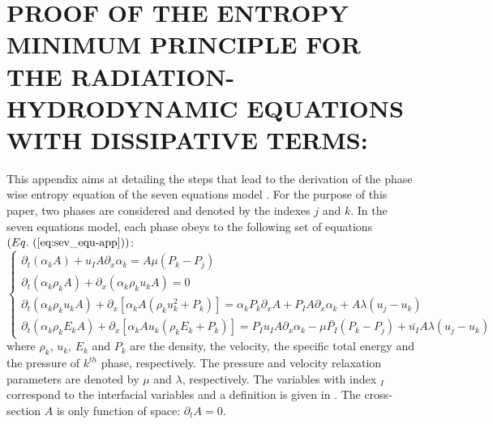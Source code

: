%
%
%


\chapter{\uppercase{Proof of the entropy minimum principle for the radiation-hydrodynamic equations with dissipative terms:}}
\label{app:sev-equ-model-entropy}
This appendix aims at detailing the steps that lead to the derivation of the phase wise entropy equation of the seven equations model \cite{SEM}. For the purpose of this paper, two phases are considered and denoted by the indexes $j$ and $k$. In the seven equations model, each phase obeys to the following set of equations $(\eqt{eq:sev_equ-app})$:
\begin{equation}
\label{eq:sev_equ-app}
\left\{
\begin{array}{llll}
\partial_t \left( \alpha_k  A\right) + u_I A \partial_x \alpha_k = A \mu \left( P_k - P_j \right)\\
\partial_t \left( \alpha_k \rho_k A \right) + \partial_x \left( \alpha_k \rho_k u_k A \right) = 0 \\
\partial_t \left( \alpha_k \rho_k u_k A \right) + \partial_x \left[ \alpha_k A \left( \rho_k u_k^2 + P_k \right) \right] = \alpha_k P_k \partial_x A + P_I A \partial_x \alpha_k + A \lambda \left( u_j - u_k \right) \\
\partial_t \left( \alpha_k \rho_k E_k A \right) + \partial_x \left[ \alpha_k A u_k \left( \rho_k E_k + P_k \right) \right] = P_I u_I A \partial_x \alpha_k - \mu \bar{P_I} \left( P_k-P_j \right) + \bar{u_I}A \lambda \left( u_j - u_k \right)
\end{array}
\right.
\end{equation}
where $\rho_k$, $u_k$, $E_k$ and $P_k$ are the density, the velocity, the specific total energy and the pressure of $k^{th}$ phase, respectively. The pressure and velocity relaxation parameters are denoted by $\mu$ and $\lambda$, respectively. The variables with index $_I$ correspond to the interfacial variables and a definition is given in . The cross-section $A$ is only function of space: $\partial_t A = 0$. 
